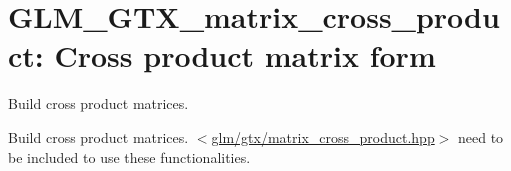 \hypertarget{group__gtx__matrix__cross__product}{\section{\-G\-L\-M\-\_\-\-G\-T\-X\-\_\-matrix\-\_\-cross\-\_\-product\-: \-Cross product matrix form}
\label{group__gtx__matrix__cross__product}
}


\-Build cross product matrices.  


\-Build cross product matrices. $<$\hyperlink{matrix__cross__product_8hpp}{glm/gtx/matrix\-\_\-cross\-\_\-product.\-hpp}$>$ need to be included to use these functionalities. 